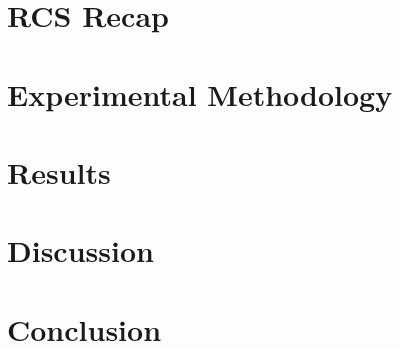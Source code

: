 \documentclass[conference]{IEEEtran}
\begin{document}
\section{RCS Recap}
\label{sec:recap}

\section{Experimental Methodology}
\label{sec:methodology}

\section{Results}
\label{sec:results}

\section{Discussion}
\label{sec:discussion}

\section{Conclusion}
\label{sec:conclusion}
\end{document}

